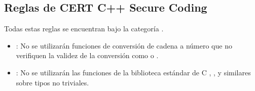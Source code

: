 \subsection{Reglas de CERT C++ Secure Coding}

Todas estas reglas se encuentran bajo la categoría .

\begin{itemize}

\item {}:
No se utilizarán funciones de conversión de cadena a número que no
verifiquen la validez de la conversión como  o .

\item {}:
No se utilizarán las funciones de la biblioteca estándar de C
, ,  y similares
sobre tipos no triviales.

\end{itemize}

